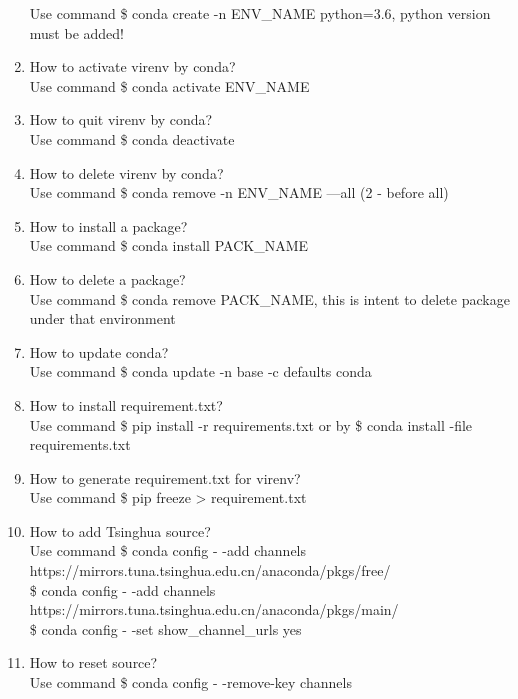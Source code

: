 \documentclass[10pt,a4paper,oneside]{article}
\begin{document}
\begin{enumerate}[1.]
Use command \$ conda create -n ENV\_NAME python=3.6, python version must be added!
\item How to activate virenv by conda?\\
Use command \$ conda activate ENV\_NAME
\item How to quit virenv by conda?\\
Use command \$ conda deactivate
\item How to delete virenv by conda?\\
Use command \$ conda remove -n ENV\_NAME —all (2 - before all)
\item How to install a package?\\
Use command \$ conda install PACK\_NAME
\item How to delete a package?\\
Use command \$ conda remove PACK\_NAME, this is intent to delete package under that environment 
\item How to update conda?\\
Use command \$ conda update -n base -c defaults conda
\item How to install requirement.txt?\\
Use command \$ pip install -r requirements.txt or by \$ conda install -file requirements.txt
\item How to generate requirement.txt for virenv?\\
Use command \$ pip freeze > requirement.txt
\item How to add Tsinghua source?\\
Use command \$ conda config - -add channels\\ https://mirrors.tuna.tsinghua.edu.cn/anaconda/pkgs/free/\\
\$ conda config - -add channels \\https://mirrors.tuna.tsinghua.edu.cn/anaconda/pkgs/main/\\
\$ conda config - -set show\_channel\_urls yes
\item How to reset source?\\
Use command \$ conda config - -remove-key channels
\end{enumerate}
\end{document}
